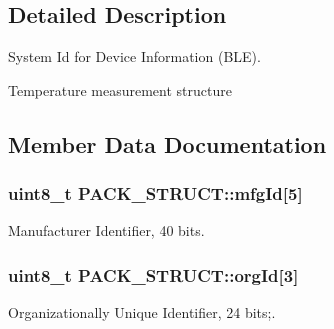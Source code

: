 \subsection{Detailed Description}
System Id for Device Information (B\-L\-E).

Temperature measurement structure 

\subsection{Member Data Documentation}
\hypertarget{struct_p_a_c_k___s_t_r_u_c_t_a65dbb98bcbfa5302e6fe41da293932b3}{
\subsubsection[{mfg\-Id}]{\setlength{\rightskip}{0pt plus 5cm}uint8\-\_\-t P\-A\-C\-K\-\_\-\-S\-T\-R\-U\-C\-T\-::mfg\-Id\mbox{[}5\mbox{]}}}\label{struct_p_a_c_k___s_t_r_u_c_t_a65dbb98bcbfa5302e6fe41da293932b3}


Manufacturer Identifier, 40 bits. 

\hypertarget{struct_p_a_c_k___s_t_r_u_c_t_a45141a2a8fb3becdabd8fe0b83aef1b6}{
\subsubsection[{org\-Id}]{\setlength{\rightskip}{0pt plus 5cm}uint8\-\_\-t P\-A\-C\-K\-\_\-\-S\-T\-R\-U\-C\-T\-::org\-Id\mbox{[}3\mbox{]}}}\label{struct_p_a_c_k___s_t_r_u_c_t_a45141a2a8fb3becdabd8fe0b83aef1b6}


Organizationally Unique Identifier, 24 bits;. 

